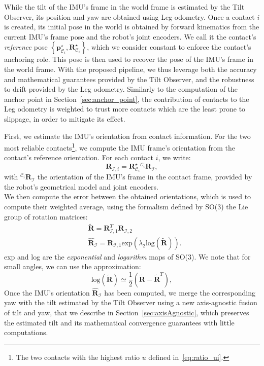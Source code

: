 \documentclass{IJCAS}
\begin{document}
While the tilt of the IMU's frame in the world frame is estimated by the Tilt Observer, its position and yaw are obtained using Leg odometry. Once a contact $i$ is created, its initial pose in the world is obtained by forward kinematics from the current IMU's frame pose and the robot's joint encoders. We call it the contact's \emph{reference} pose $\left\{ \boldsymbol{p}^{\star}_{\mathcal{C}_{i}}, \boldsymbol{R}^{\star}_{\mathcal{C}_{i}}\right\}$, which we consider constant to enforce the contact's anchoring role. This pose is then used to recover the pose of the IMU's frame in the world frame. 
With the proposed pipeline, we thus leverage both the accuracy and mathematical guarantees provided by the Tilt Observer, and the robustness to drift provided by the Leg odometry. Similarly to the computation of the anchor point in Section~\ref{sec:anchor_point}, the contribution of contacts to the Leg odometry is weighted to trust more contacts which are the least prone to slippage, in order to mitigate its effect.

First, we estimate the IMU's orientation from contact information. For the two most reliable contacts\footnote{The two contacts with the highest ratio $u$ defined in~\eqref{eq:ratio_ui}.}, we compute the IMU frame's orientation from the contact's reference orientation. For each contact $i$, we write:
\begin{equation}
    \boldsymbol{R}_{\mathcal{I}, i} = \boldsymbol{R}^{\star}_{\mathcal{C}_{i}} {}^{\mathcal{C}_{i}} \boldsymbol{R}_{\mathcal{I}},
\end{equation}
with ${}^{\mathcal{C}_{i}} \boldsymbol{R}_{\mathcal{I}}$ the orientation of the IMU's frame in the contact frame, provided by the robot's geometrical model and joint encoders.\\
We then compute the error between the obtained orientations, which is used to compute their weighted average, using the formalism defined by SO(3) the Lie group of rotation matrices:
\begin{align}
    &\tilde{\boldsymbol{R}} = \boldsymbol{R}^{T}_{\mathcal{I}, 1} \boldsymbol{R}_{\mathcal{I}, 2}  \\
 & \hat{\boldsymbol{R}}_{\mathcal{I}} = \boldsymbol{R}_{\mathcal{I}, 1} \text{exp} \left( \lambda_{2}\text{log} \left( \tilde{\boldsymbol{R}}\right)  \right). \label{eq:leg_odom_avg_ori}
\end{align}
exp and log are the \emph{exponential} and \emph{logarithm} maps of SO(3). We note that for small angles, we can use the approximation:
\begin{equation}
\text{log}\left(\tilde{\boldsymbol{R}}\right) \simeq \frac{1}{2} \left(\tilde{\boldsymbol{R}}-\tilde{\boldsymbol{R}}^{T}\right), \label{eq:log_small}
\end{equation}
Once the IMU's orientation $\hat{\boldsymbol{R}}_{\mathcal{I}}$ has been computed, we merge the corresponding yaw with the tilt estimated by the Tilt Observer using a new axis-agnostic fusion of tilt and yaw, that we describe in Section~\ref{sec:axisAgnostic}, which preserves the estimated tilt and its mathematical convergence guarantees with little computations.
\end{document}
